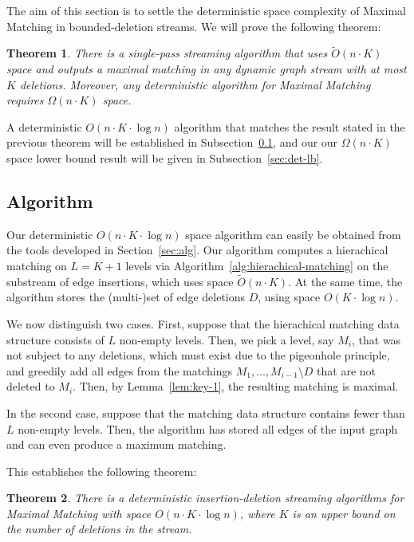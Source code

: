 \documentclass[11pt,a4paper]{article}
\newtheorem{theorem}{Theorem}
\begin{document}
The aim of this section is to settle the deterministic space complexity of \textsf{Maximal Matching} in bounded-deletion streams. We will prove the following theorem:


\setcounter{thmsaved}{\value{theorem}}
\setcounter{theorem}{\value{counterDET}}
\addtocounter{theorem}{-1}
\begin{theorem}
There is a single-pass streaming algorithm that uses $\tilde{O}(n \cdot K)$ space and outputs a maximal matching in any dynamic graph stream with at most $K$ deletions. Moreover, any deterministic algorithm for \textsf{Maximal Matching} requires $\Omega(n \cdot K)$ space.
\end{theorem}
\setcounter{theorem}{\value{thmsaved}}

A deterministic $O(n \cdot K \cdot \log n)$ algorithm that matches the result stated in the previous theorem will be established in Subsection~\ref{sec:det-alg}, and our our $\Omega(n \cdot K)$ space lower bound result will be given in Subsection~\ref{sec:det-lb}.

\subsection{Algorithm} \label{sec:det-alg}
Our deterministic $O(n \cdot K \cdot \log n)$ space algorithm can easily be obtained from the tools developed in Section~\ref{sec:alg}. Our algorithm computes a hierachical matching on $L=K+1$ levels via Algorithm~\ref{alg:hierachical-matching} on the substream of edge insertions, which uses space $\tilde{O}(n \cdot K)$. At the same time, the algorithm stores the (multi-)set of edge deletions $D$, using space $O(K \cdot \log n)$. 

We now distinguish two cases. First, suppose that the hierachical matching data structure consists of $L$ non-empty levels. Then, we pick a level, say $M_i$, that was not subject to any deletions, which must exist due to the pigeonhole principle, and greedily add all edges from the matchings $M_1, \dots, M_{i-1} \setminus D$ that are not deleted to $M_i$. Then, by Lemma~\ref{lem:key-1}, the resulting matching is maximal.

In the second case, suppose that the matching data structure contains fewer than $L$ non-empty levels. Then, the algorithm has stored all edges of the input graph and can even produce a maximum matching. 

This establishes the following theorem:

\begin{theorem} \label{thm:det-alg}
    There is a deterministic insertion-deletion streaming algorithms for \textsf{Maximal Matching} with space $O(n \cdot K \cdot \log n)$, where $K$ is an upper bound on the number of deletions in the stream. 
\end{theorem}
\end{document}
